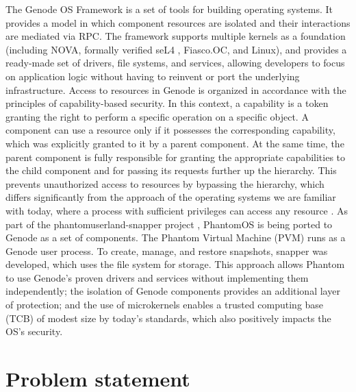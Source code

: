 The Genode OS Framework is a set of tools for building operating systems. It provides a model in which component resources are isolated and their interactions are mediated via RPC. The framework supports multiple kernels as a foundation (including NOVA, formally verified seL4 \cite{seL4}, Fiasco.OC, and Linux), and provides a ready-made set of drivers, file systems, and services, allowing developers to focus on application logic without having to reinvent or port the underlying infrastructure.
Access to resources in Genode is organized in accordance with the principles of capability-based security.
In this context, a capability is a token granting the right to perform a specific operation on a specific object. A component can use a resource only if it possesses the corresponding capability, which was explicitly granted to it by a parent component. At the same time, the parent component is fully responsible for granting the appropriate capabilities to the child component and for passing its requests further up the hierarchy. This prevents unauthorized access to resources by bypassing the hierarchy, which differs significantly from the approach of the operating systems we are familiar with today, where a process with sufficient privileges can access any resource \cite{Genode_Foundations}.
As part of the phantomuserland-snapper project \cite{GitHub_phantomuserland-snapper}, PhantomOS is being ported to Genode as a set of components. The Phantom Virtual Machine (PVM) runs as a Genode user process. To create, manage, and restore snapshots, snapper \cite{GitHub_Snapper} was developed, which uses the file system for storage. This approach allows Phantom to use Genode’s proven drivers and services without implementing them independently; the isolation of Genode components provides an additional layer of protection; and the use of microkernels enables a trusted computing base (TCB) of modest size by today’s standards, which also positively impacts the OS’s security.

\section{Problem statement}

